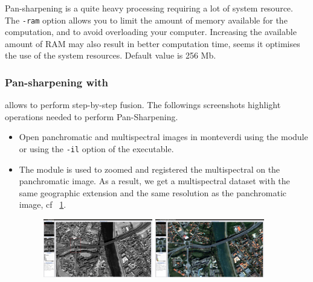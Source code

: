 Pan-sharpening is a quite heavy processing requiring a lot of system
resource. The \verb?-ram? option allows you to limit the amount of memory
available for the computation, and to avoid overloading your
computer. Increasing the available amount of RAM may also result in
better computation time, seems it optimises the use of the system
resources. Default value is 256 Mb.


\subsubsection{Pan-sharpening with \mont}

\mont allows to perform step-by-step fusion. The followings screenshots highlight operations needed to perform Pan-Sharpening.

\begin{itemize}
\item Open panchromatic and multispectral images in monteverdi using the  module or using the  \verb?-il? option of the \mont executable.

\item The  module is used to zoomed and registered
  the multispectral on the panchromatic image. As a result, we get a
  multispectral dataset with the same geographic extension and the
  same resolution as the panchromatic image, cf ~\ref{fig:qbmulsuper}.

\begin{figure}
  \center
  \includegraphics[width=0.45\textwidth]{../Art/MonteverdiImages/monteverdi_QB_PAN_ROI.png}
  \includegraphics[width=0.45\textwidth]{../Art/MonteverdiImages/monteverdi_QB_MUL_Superimpose.png}
  \label{fig:qbmulsuper}
\end{figure}


\end{itemize}
